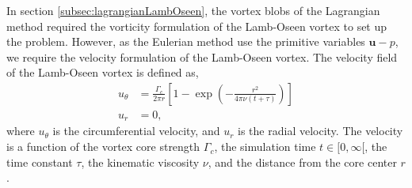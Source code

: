 
In section \ref{subsec:lagrangianLambOseen}, the vortex blobs of the Lagrangian method required the vorticity formulation of the Lamb-Oseen vortex to set up the problem. However, as the Eulerian method use the primitive variables $\mathbf{u}-p$, we require the velocity formulation of the Lamb-Oseen vortex. The velocity field of the Lamb-Oseen vortex is defined as,
	\begin{subequations}
	\begin{align}
	u_{\theta} &= \frac{\Gamma_c}{2\pi r} \left[1-\exp\left(-\frac{r^2}{4\pi\nu(t+\tau)}\right)\right]\\
	u_r &= 0,
	\end{align}
	\label{eq:eLO_veq}
	\end{subequations}	
where $u_{\theta}$ is the circumferential velocity, and $u_r$ is the radial velocity. The velocity is a function of the vortex core strength $\Gamma_c$, the simulation time $t\in[0,\infty[$, the time constant $\tau$, the kinematic viscosity $\nu$, and the distance from the core center $r$.

